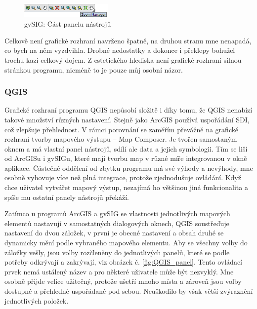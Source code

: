 \documentclass[a4paper,12pt,draft]{article}
\begin{document}
{\begin{figure}[h!]
\centering
\includegraphics[width=0.4\textwidth]{./GUI_screenshots/gvSIG_toolbar.png}
\caption{gvSIG: Část panelu nástrojů}
\label{fig:gvSIG_toolbar}
\end{figure}

%

Celkově není grafické rozhraní navrženo špatně, na druhou stranu mne
nenapadá, co bych na něm vyzdvihla. Drobné nedostatky a dokonce i překlepy
bohužel trochu kazí celkový dojem. Z estetického hlediska není grafické
rozhraní silnou stránkou programu, nicméně to je pouze můj osobní názor.

\subsubsection{QGIS}
Grafické rozhraní programu QGIS nepůsobí složitě i díky tomu, že QGIS
nenabízí takové množství různých nastavení. Stejně jako ArcGIS používá
uspořádání SDI, což zlepšuje přehlednost. V rámci porovnání se zaměřím převážně
na grafické rozhraní tvorby mapového výstupu -- Map Composer. Je tvořen
samostaným oknem a má vlastní panel nástrojů, sdílí ale data a jejich
symbologii. Tím se liší od ArcGISu i gvSIGu, které mají tvorbu map v
různé míře integrovanou v okně aplikace. Částečné oddělení od zbytku
programu má své výhody a nevýhody, mne osobně vyhovuje více než
plná integrace, protože zjednodušuje ovládání. Když chce uživatel
vytvářet mapový výstup, nezajímá ho většinou jiná funkcionalita a
spíše mu ostatní panely nástrojů překáží.

Zatímco u programů ArcGIS a gvSIG se vlastnosti jednotlivých mapových
elementů nastavují v samostatných dialogových oknech, QGIS soustřeďuje
nastavení do dvou záložek, v první je obecné nastavení a obsah
druhé se dynamicky mění podle vybraného mapového elementu. Aby se
všechny volby do záložky vešly, jsou volby rozčleněny do jednotlivých
panelů, které se podle potřeby odkrývají a zakrývají, viz obrázek
č. \ref{fig:QGIS_panel}. Tento ovládací prvek nemá ustálený název
a pro některé uživatele může být nezvyklý. Mne osobně přijde
velice užitečný, protože ušetří mnoho místa a zároveň jsou volby
dostupné a přehledně uspořádané pod sebou. Neuškodilo by však větší
zvýraznění jednotlivých položek.


}
\end{document}
